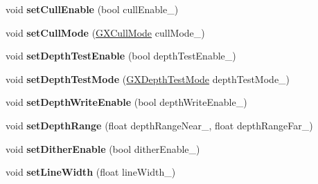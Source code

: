 \begin{DoxyCompactItemize}
\item 
void {\bfseries set\+Cull\+Enable} (bool cull\+Enable\+\_\+)\hypertarget{class_i_dream_sky_1_1_material_1_1_state_block_a443c429bdfebc08145e1401511b48b63}{}\label{class_i_dream_sky_1_1_material_1_1_state_block_a443c429bdfebc08145e1401511b48b63}

\item 
void {\bfseries set\+Cull\+Mode} (\hyperlink{class_i_dream_sky_1_1_g_x_cull_mode}{G\+X\+Cull\+Mode} cull\+Mode\+\_\+)\hypertarget{class_i_dream_sky_1_1_material_1_1_state_block_a37dfbd63f4c732030784b11cde1c35ba}{}\label{class_i_dream_sky_1_1_material_1_1_state_block_a37dfbd63f4c732030784b11cde1c35ba}

\item 
void {\bfseries set\+Depth\+Test\+Enable} (bool depth\+Test\+Enable\+\_\+)\hypertarget{class_i_dream_sky_1_1_material_1_1_state_block_ae0b61753b55222c095befe2405228e25}{}\label{class_i_dream_sky_1_1_material_1_1_state_block_ae0b61753b55222c095befe2405228e25}

\item 
void {\bfseries set\+Depth\+Test\+Mode} (\hyperlink{class_i_dream_sky_1_1_g_x_depth_test_mode}{G\+X\+Depth\+Test\+Mode} depth\+Test\+Mode\+\_\+)\hypertarget{class_i_dream_sky_1_1_material_1_1_state_block_af699f6c604e90e7547cf4f21d58cb429}{}\label{class_i_dream_sky_1_1_material_1_1_state_block_af699f6c604e90e7547cf4f21d58cb429}

\item 
void {\bfseries set\+Depth\+Write\+Enable} (bool depth\+Write\+Enable\+\_\+)\hypertarget{class_i_dream_sky_1_1_material_1_1_state_block_a0fc3229e092b5c3f9348472a2359e689}{}\label{class_i_dream_sky_1_1_material_1_1_state_block_a0fc3229e092b5c3f9348472a2359e689}

\item 
void {\bfseries set\+Depth\+Range} (float depth\+Range\+Near\+\_\+, float depth\+Range\+Far\+\_\+)\hypertarget{class_i_dream_sky_1_1_material_1_1_state_block_a4b9d181e3aa6c46a61c386f9404730e2}{}\label{class_i_dream_sky_1_1_material_1_1_state_block_a4b9d181e3aa6c46a61c386f9404730e2}

\item 
void {\bfseries set\+Dither\+Enable} (bool dither\+Enable\+\_\+)\hypertarget{class_i_dream_sky_1_1_material_1_1_state_block_afa48ccad9ff8def19edcf6092d9d32a6}{}\label{class_i_dream_sky_1_1_material_1_1_state_block_afa48ccad9ff8def19edcf6092d9d32a6}

\item 
void {\bfseries set\+Line\+Width} (float line\+Width\+\_\+)\hypertarget{class_i_dream_sky_1_1_material_1_1_state_block_ae261e50681c939bc368406a7bd7abc13}{}\label{class_i_dream_sky_1_1_material_1_1_state_block_ae261e50681c939bc368406a7bd7abc13}


\end{DoxyCompactItemize}

